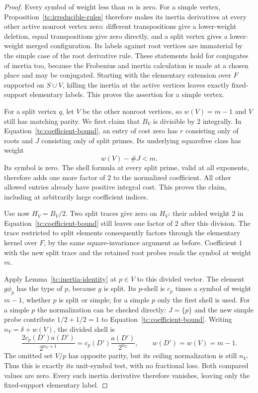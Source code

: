 \begin{proof}
Every symbol of weight less than $m$ is zero.  For a simple
vertex, Proposition~\ref{tc:irreducible-rules} therefore makes
its inertia derivatives at every other active nonroot vertex
zero: different transpositions give a lower-weight deletion,
equal transpositions give zero directly, and a split vertex
gives a lower-weight merged configuration.  Its labels against
root vertices are immaterial by the simple case of the root
derivative rule.  These statements hold for conjugates of
inertia too, because the Frobenius and inertia calculation is
made at a chosen place and may be conjugated.  Starting with
the elementary extension over $F$ supported on $S\cup V$,
killing the inertia at the active vertices leaves exactly
fixed-support elementary labels.  This proves the assertion
for a simple vertex.

For a split vertex $q$, let $V$ be the other nonroot vertices,
so $w(V)=m-1$ and $V$ still has matching parity.  We first claim
that $B_V$ is divisible by $2$ integrally.  In
Equation~\eqref{tc:coefficient-bound}, an entry of cost zero
has $r$ consisting only of roots and $J$ consisting only of
split primes.  Its underlying squarefree class has weight
\[
                         w(V)-\#J<m.
\]
Its symbol is zero.  The shell formula at every split prime,
valid at all exponents, therefore adds one more factor of $2$
to the normalized coefficient.  All other allowed entries
already have positive integral cost.  This proves the claim,
including at arbitrarily large coefficient indices.

Use now $H_V=B_V/2$.  Two split traces give zero on $H_V$:
their added weight $2$ in
Equation~\eqref{tc:coefficient-bound} still leaves one factor
of $2$ after this division.  The trace restricted to split
elements consequently factors through the elementary kernel
over $F$, by the same square-invariance argument as before.
Coefficient $1$ with the new split trace and the retained
root probes reads the symbol at weight $m$.

Apply Lemma~\ref{tc:inertia-identity} at $p\in V$ to this
divided vector.  The element $g\phi_p$ has the type of $p$,
because $g$ is split.  Its $p$-shell is $c_p$ times a symbol
of weight $m-1$, whether $p$ is split or simple; for a simple
$p$ only the first shell is used.  For a simple $p$ the normalization can be checked directly:
$J=\{p\}$ and the new simple probe contribute $1/2+1/2=1$ to
Equation~\eqref{tc:coefficient-bound}. Writing
$n_V=\delta+w(V)$, the divided shell is
\[
 \frac{2c_p(D')a(D')}{2^{n_V+1}}
 =c_p(D')\frac{a(D')}{2^{n_V}},\qquad w(D')=w(V)=m-1.
\]
The omitted set $V/p$ has opposite parity, but its ceiling
normalization is still $n_V$. Thus this is exactly its unit-symbol
test, with no fractional loss. Both compared values are zero.
Every such inertia derivative therefore vanishes, leaving only the
fixed-support elementary label.


\end{proof}
